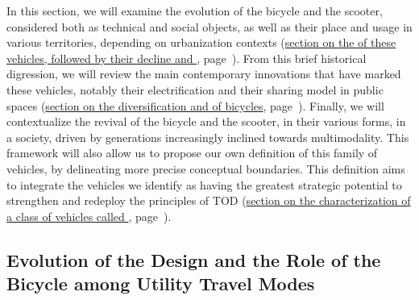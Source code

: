 \begin{refsegment}
In this section, we will examine the evolution of the bicycle and the scooter, considered both as technical and social objects, as well as their place and usage in various territories, depending on urbanization contexts (\hyperref[chap1:proximite-velo-trottinette]{section on the  of these vehicles, followed by their decline and }, page~\pageref{chap1:proximite-velo-trottinette}). From this brief historical digression, we will review the main contemporary innovations that have marked these vehicles, notably their electrification and their sharing model in public spaces (\hyperref[chap1:velo-micromobilite-innovations]{section on the diversification and  of bicycles}, page~\pageref{chap1:velo-micromobilite-innovations}). Finally, we will contextualize the revival of the bicycle and the scooter, in their various forms, in a  society, driven by generations increasingly inclined towards \gls{multimodality}. This framework will also allow us to propose our own definition of this family of vehicles, by delineating more precise conceptual boundaries. This definition aims to integrate the vehicles we identify as having the greatest strategic potential to strengthen and redeploy the principles of \acrshort{TOD} (\hyperref[chap1:caracterisation-mobilite-individuelle-legere]{section on the characterization of a class of vehicles called }, page~\pageref{chap1:caracterisation-mobilite-individuelle-legere}).%

\subsection{Evolution of the Design and the Role of the Bicycle among Utility Travel Modes
    \label{chap1:proximite-velo-trottinette}
    }


\end{refsegment}
